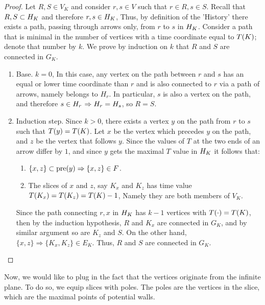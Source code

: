   \begin{proof}
    Let $R, S \in V_{K}$ and consider $r,s \in V$ such that $r \in R, s \in S$. Recall that $R,S \subset H_{K}$ and therefore $r,s \in H_{K}$, Thus, by definition of the 'History' there exists a path, passing through arrows only, from $r$ to $s$ in $H_{K}$.
    Consider a path that is minimal in the number of vertices with a time coordinate equal to $T(K)$; denote that number by $k$. We prove by induction on $k$ that $R$ and $S$ are connected in $G_{K}$.

      \begin{enumerate}
      \item Base. $k=0$, In this case, any vertex on the path between $r$ and $s$ has an equal or lower time coordinate than $r$ and is also connected to $r$ via a path of arrows, namely belongs to $H_{r}$. In particular, $s$ is also a vertex on the path, and therefore $s \in H_{r}$ $\Rightarrow H_{r} = H_{s}$, so $R = S$.
      \item Induction step. Since $k > 0 $, there exists a vertex $y$ on the path from $r$ to $s$ such that $T(y) = T(K)$. Let $x$ be the vertex which precedes $y$ on the path, and $z$ be the vertex that follows $y$. Since the values of $T$ at the two ends of an arrow differ by $1$, and since $y$ gets the maximal $T$ value in $H_{K}$ it follows that: 
        \begin{enumerate}
          \item $\{x,z\} \subset \text{pre}(y) \Rightarrow \{x,z\} \in F$. 
          \item The slices of $x$ and $z$, say $K_{x}$ and $K_{z}$ has time value $T(K_{x}) = T(K_{z}) = T(K) -1$, Namely they are both members of $V_{K}$. 
        \end{enumerate}
        Since the path connecting $r,x$ in $H_{K}$ has $k-1$ vertices with $T(\cdot) = T(K)$, then by the induction hypothesis, $R$ and $K_{x}$ are connected in $G_{K}$, and by similar argument so are $K_{z}$ and $S$. On the other hand, $ \{x,z\} \Rightarrow \{K_{x},K_{z}\} \in E_{K}$. Thus, $R$ and $S$ are connected in $G_{K}$.
    \end{enumerate}
  \end{proof}
  Now, we would like to plug in the fact that the vertices originate from the infinite plane. To do so, we equip slices with poles. The poles are the vertices in the slice, which are the maximal points of potential walls.
